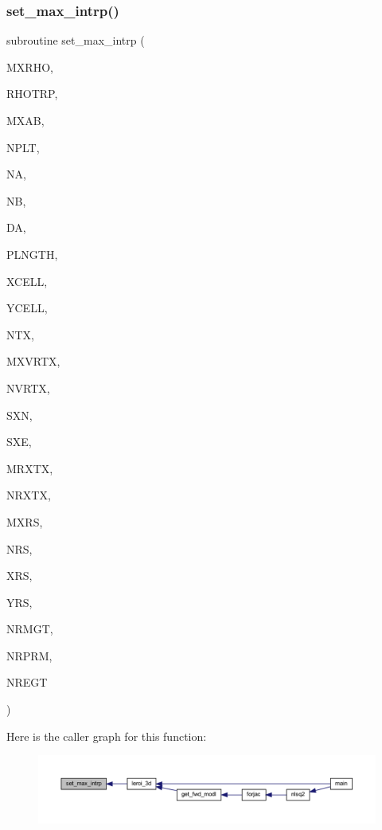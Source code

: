 \subsubsection{\texorpdfstring{set\+\_\+max\+\_\+intrp()}{set\_max\_intrp()}}
{\footnotesize\ttfamily subroutine set\+\_\+max\+\_\+intrp (\begin{DoxyParamCaption}\item[{integer}]{M\+X\+R\+HO,  }\item[{real, dimension(mxrho)}]{R\+H\+O\+T\+RP,  }\item[{integer}]{M\+X\+AB,  }\item[{integer}]{N\+P\+LT,  }\item[{integer, dimension(nplt)}]{NA,  }\item[{integer, dimension(nplt)}]{NB,  }\item[{real, dimension(nplt)}]{DA,  }\item[{real, dimension(nplt)}]{P\+L\+N\+G\+TH,  }\item[{real, dimension(mxab,nplt)}]{X\+C\+E\+LL,  }\item[{real, dimension(mxab,nplt)}]{Y\+C\+E\+LL,  }\item[{integer}]{N\+TX,  }\item[{integer}]{M\+X\+V\+R\+TX,  }\item[{integer, dimension(ntx)}]{N\+V\+R\+TX,  }\item[{real, dimension(mxvrtx,ntx)}]{S\+XN,  }\item[{real, dimension(mxvrtx,ntx)}]{S\+XE,  }\item[{integer}]{M\+R\+X\+TX,  }\item[{integer, dimension(ntx)}]{N\+R\+X\+TX,  }\item[{integer}]{M\+X\+RS,  }\item[{integer, dimension(mrxtx,ntx)}]{N\+RS,  }\item[{real, dimension (mxrs,mrxtx,ntx)}]{X\+RS,  }\item[{real, dimension (mxrs,mrxtx,ntx)}]{Y\+RS,  }\item[{integer}]{N\+R\+M\+GT,  }\item[{integer}]{N\+R\+P\+RM,  }\item[{integer}]{N\+R\+E\+GT }\end{DoxyParamCaption})}

Here is the caller graph for this function\+:\nopagebreak
\begin{figure}[H]
\begin{center}
\leavevmode
\includegraphics[width=350pt]{Leroi_8f90_a27d896475f3529fb2188ec4474b27717_icgraph}
\end{center}
\end{figure}
\mbox{\label{Leroi_8f90_a820f6bd31435032872330d97a6fdf404}} 
